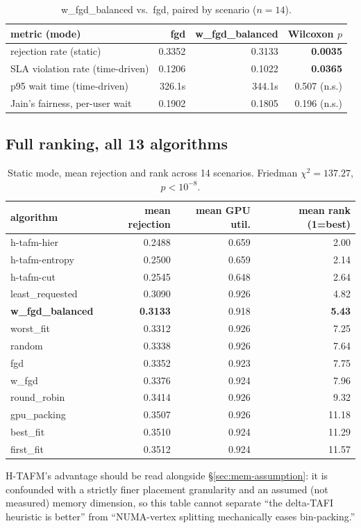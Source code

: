 \documentclass[11pt]{article}
\begin{document}
\begin{table}[h]
\centering
\caption{w\_fgd\_balanced vs.\ fgd, paired by scenario ($n=14$).}
\label{tab:did-we-break-it}
\small
\begin{tabular}{lrrr}
\toprule
metric (mode) & fgd & w\_fgd\_balanced & Wilcoxon $p$ \\
\midrule
rejection rate (static) & 0.3352 & 0.3133 & \textbf{0.0035} \\
SLA violation rate (time-driven) & 0.1206 & 0.1022 & \textbf{0.0365} \\
p95 wait time (time-driven) & 326.1s & 344.1s & 0.507 (n.s.) \\
Jain's fairness, per-user wait & 0.1902 & 0.1805 & 0.196 (n.s.) \\
\bottomrule
\end{tabular}
\end{table}

\subsection{Full ranking, all 13 algorithms}
\begin{table}[h]
\centering
\caption{Static mode, mean rejection and rank across 14 scenarios. Friedman $\chi^2=137.27$, $p<10^{-8}$.}
\small
\begin{tabular}{lrrr}
\toprule
algorithm & mean rejection & mean GPU util. & mean rank (1=best) \\
\midrule
h-tafm-hier & 0.2488 & 0.659 & 2.00 \\
h-tafm-entropy & 0.2500 & 0.659 & 2.14 \\
h-tafm-cut & 0.2545 & 0.648 & 2.64 \\
least\_requested & 0.3090 & 0.926 & 4.82 \\
\textbf{w\_fgd\_balanced} & \textbf{0.3133} & 0.918 & \textbf{5.43} \\
worst\_fit & 0.3312 & 0.926 & 7.25 \\
random & 0.3338 & 0.926 & 7.64 \\
fgd & 0.3352 & 0.923 & 7.75 \\
w\_fgd & 0.3376 & 0.924 & 7.96 \\
round\_robin & 0.3414 & 0.926 & 9.32 \\
gpu\_packing & 0.3507 & 0.926 & 11.18 \\
best\_fit & 0.3510 & 0.924 & 11.29 \\
first\_fit & 0.3512 & 0.924 & 11.57 \\
\bottomrule
\end{tabular}
\end{table}
H-TAFM's advantage should be read alongside \S\ref{sec:mem-assumption}: it
is confounded with a strictly finer placement granularity and an assumed
(not measured) memory dimension, so this table cannot separate ``the
delta-TAFI heuristic is better'' from ``NUMA-vertex splitting mechanically
eases bin-packing.''
\end{document}
